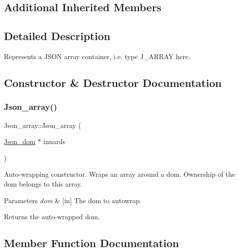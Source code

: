 \subsection*{Additional Inherited Members}


\subsection{Detailed Description}
Represents a J\+S\+ON array container, i.\+e. type J\+\_\+\+A\+R\+R\+AY here. 

\subsection{Constructor \& Destructor Documentation}
\mbox{\label{classJson__array_ac99abb112ea6f5b01b841c47b42908a3}} 
\subsubsection{\texorpdfstring{Json\+\_\+array()}{Json\_array()}}
{\footnotesize\ttfamily Json\+\_\+array\+::\+Json\+\_\+array (\begin{DoxyParamCaption}\item[{\mbox{\hyperlink{classJson__dom}{Json\+\_\+dom}} $\ast$}]{innards }\end{DoxyParamCaption})\hspace{0.3cm}{\ttfamily [explicit]}}

Auto-\/wrapping constructor. Wraps an array around a dom. Ownership of the dom belongs to this array.


\begin{DoxyParams}{Parameters}
{\em dom} & \mbox{[}in\mbox{]} The dom to autowrap. \\
\hline
\end{DoxyParams}
\begin{DoxyReturn}{Returns}
the auto-\/wrapped dom. 
\end{DoxyReturn}


\subsection{Member Function Documentation}
\mbox{\label{classJson__array_abd10bd299c6268b5195e79ed5536be1f}} 
